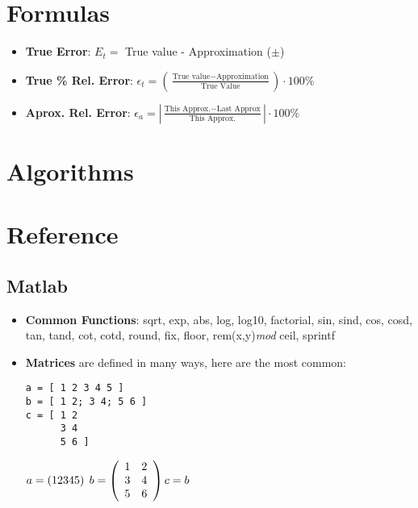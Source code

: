 \documentclass[fontsize=5pt]{scrartcl}
\begin{document}
\begin{multicols}{3}
\begin{enumerate}
    \end{enumerate}
    
  \section{Formulas}
      \begin{itemize}
        \item \textbf{True Error}: $E_t =$ True value - Approximation ($\pm$)
        \item \textbf{True \% Rel. Error}: $\epsilon_t = (\frac{\text{True value} - \text{Approximation}}{\text{True Value}})\cdot100\%$
        \item \textbf{Aprox. Rel. Error}: $\epsilon_a =  |\frac{\text{This Approx.} - \text{Last Approx}}{\text{This Approx.}}|\cdot100\%$
      \end{itemize}
      
  \section{Algorithms}
    
      
  \section{Reference}
    \subsection{Matlab}
      \begin{itemize}
        \item \textbf{Common Functions}:
          sqrt, 
          exp, 
          abs,  
          log, 
          log10, 
          factorial, 
          sin, 
          sind, 
          cos,  
          cosd, 
          tan, 
          tand, 
          cot, 
          cotd, 
          round, 
          fix, 
          floor, 
          rem(x,y)\textit{mod}
          ceil, 
          sprintf
        \item \textbf{Matrices} are defined in many ways, here are the most common:
          \lstset{language=Matlab}
          \begin{lstlisting}
a = [ 1 2 3 4 5 ]
b = [ 1 2; 3 4; 5 6 ]
c = [ 1 2
      3 4
      5 6 ]
          \end{lstlisting}%
          $%
          a = \left( 1 2 3 4 5 \right)\hspace{1mm}
          b = \left( \begin{array}{cc}
                      1 & 2 \\
                      3 & 4 \\ 
                      5 & 6 \\
                    \end{array}
                    \right)
          c = b
          $
        \end{itemize}

\end{multicols}
\end{document}
